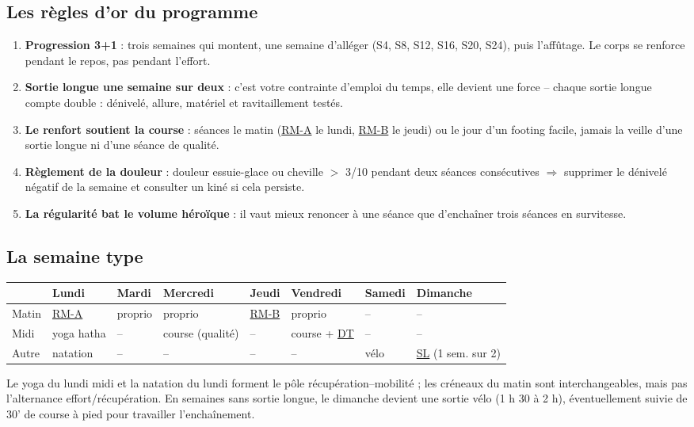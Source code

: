 \documentclass[10pt,a4paper]{article}
\newcommand{\key}[1]{\textbf{\sffamily\small\color{acc}#1}}
\newcommand{\jday}[1]{\textbf{\sffamily\footnotesize\color{acc}#1}}
\newcommand{\rma}{\hyperlink{rm-a}{RM-A}}
\newcommand{\rmb}{\hyperlink{rm-b}{RM-B}}
\newcommand{\dtl}{\hyperlink{dt}{DT}}
\newcommand{\sln}{\hyperlink{legende}{SL}}
\begin{document}
\subsection{Les r\`egles d'or du programme}
\begin{enumerate}
\item \key{Progression 3+1} : trois semaines qui montent, une semaine
d'all\'eger (S4, S8, S12, S16, S20, S24), puis l'aff\^utage. Le corps se
renforce pendant le repos, pas pendant l'effort.
\item \key{Sortie longue une semaine sur deux} : c'est votre contrainte
d'emploi du temps, elle devient une force -- chaque sortie longue compte
double : d\'enivel\'e, allure, mat\'eriel et ravitaillement test\'es.
\item \key{Le renfort soutient la course} : s\'eances le matin (\rma{} le
lundi, \rmb{} le jeudi) ou le jour d'un footing facile, jamais la veille
d'une sortie longue ni d'une s\'eance de qualit\'e.
\item \key{R\`eglement de la douleur} : douleur essuie-glace ou cheville
$>$ 3/10 pendant deux s\'eances cons\'ecutives $\Rightarrow$ supprimer le
d\'enivel\'e n\'egatif de la semaine et consulter un kin\'e si cela persiste.
\item \key{La r\'egularit\'e bat le volume h\'ero\"ique} : il vaut mieux
renoncer \`a une s\'eance que d'encha\^iner trois s\'eances en survitesse.
\end{enumerate}

\subsection{La semaine type}
\begin{center}
\small
\begin{tabular}{@{}llllllll@{}}
\toprule
& \jday{Lundi} & \jday{Mardi} & \jday{Mercredi} & \jday{Jeudi} & \jday{Vendredi} & \jday{Samedi} & \jday{Dimanche}\\
\midrule
Matin & \rma{} & proprio & proprio & \rmb{} & proprio & -- & --\\
Midi & yoga hatha & -- & course (qualit\'e) & -- & course + \dtl{} & -- & --\\
Autre & natation & -- & -- & -- & -- & v\'elo & \sln{} (1 sem. sur 2)\\
\bottomrule
\end{tabular}
\end{center}
\smallskip
Le yoga du lundi midi et la natation du lundi forment le p\^ole
r\'ecup\'eration--mobilit\'e ; les cr\'eneaux du matin sont interchangeables,
mais pas l'alternance effort/r\'ecup\'eration. En semaines sans sortie longue,
le dimanche devient une sortie v\'elo (1 h 30 \`a 2 h), \'eventuellement
suivie de 30' de course \`a pied pour travailler l'encha\^inement.
\end{document}
